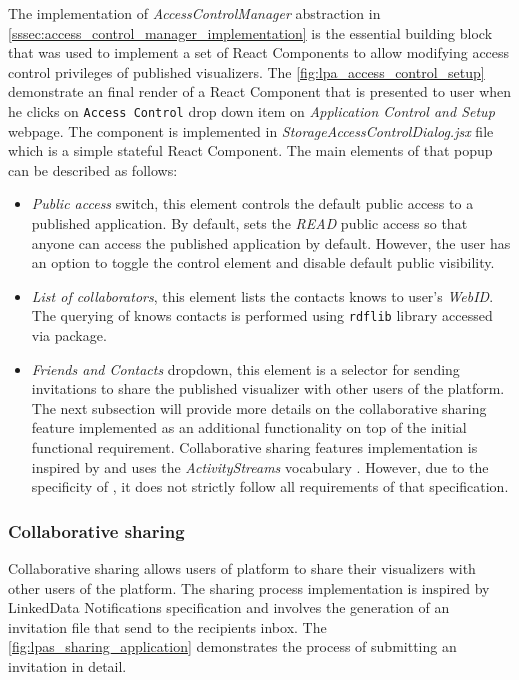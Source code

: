 The implementation of \textit{AccessControlManager} abstraction in \autoref{sssec:access_control_manager_implementation} is the essential building block that was used to implement a set of React Components to allow modifying access control privileges of published visualizers. The \autoref{fig:lpa_access_control_setup} demonstrate an final render of a React Component that is presented to user when he clicks on \texttt{Access Control} drop down item on \textit{Application Control and Setup} webpage. The component is implemented in \textit{StorageAccessControlDialog.jsx} file which is a simple stateful React Component. The main elements of that popup can be described as follows:
\begin{itemize}
    \item \textit{Public access} switch, this element controls the default public access to a published application. By default, \lpa{} sets the \textit{READ} public access so that anyone can access the published application by default. However, the user has an option to toggle the control element and disable default public visibility. 
    \item \textit{List of collaborators}, this element lists the contacts knows to user's \textit{WebID}. The querying of knows contacts is performed using \texttt{rdflib} library accessed via \lpas{} package. 
    \item \textit{Friends and Contacts} dropdown, this element is a selector for sending invitations to share the published visualizer with other users of the platform. The next subsection will provide more details on the collaborative sharing feature implemented as an additional functionality on top of the initial functional requirement. Collaborative sharing features implementation is inspired by  and uses the \textit{ActivityStreams} vocabulary . However, due to the specificity of \lpa{}, it does not strictly follow all requirements of that specification. 
\end{itemize}

\subsubsection{Collaborative sharing}

Collaborative sharing allows users of \lpa{} platform to share their visualizers with other users of the platform. The sharing process implementation is inspired by LinkedData Notifications specification  and involves the generation of an invitation file that send to the recipients inbox. The \autoref{fig:lpas_sharing_application} demonstrates the process of submitting an invitation in detail.

